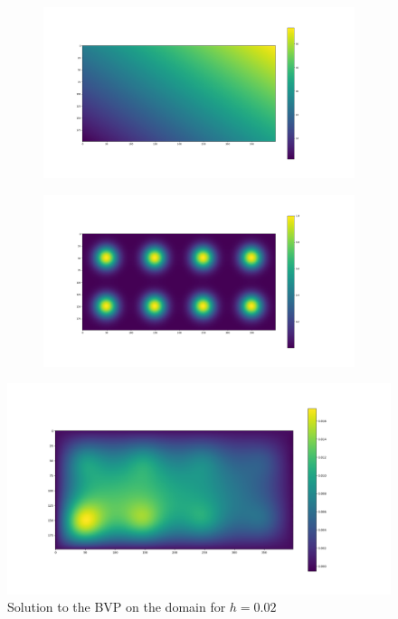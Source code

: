 \documentclass{article}
\begin{document}
\begin{figure}[H]
	\begin{subfigure}{.5\textwidth}
		\centering
		\includegraphics[width=.9\linewidth]{1k.png}
	\end{subfigure}
	\begin{subfigure}{.5\textwidth}
		\centering
		\includegraphics[width=.9\linewidth]{1src.png}
	\end{subfigure}
\end{figure}
\begin{figure}[H]
	\centering
	\includegraphics[width=.9\linewidth]{1sol.png}
	\caption{Solution to the BVP on the domain for $h=0.02$}
\end{figure}
\end{document}
